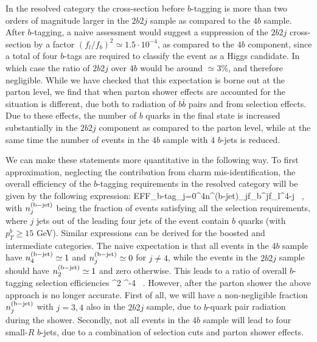 In the resolved category 
the cross-section  before
$b$-tagging is more than two orders
of magnitude larger in the $2b2j$
sample as compared to the $4b$ sample.
%
After $b$-tagging, a naive assessment would
suggest a suppression of the $2b2j$ cross-section by a factor $(f_l/f_b)^2 \simeq
1.5\cdot 10^{-4}$, as compared to the $4b$ component,
since a total of four $b$-tags are required to classify the
event as a Higgs candidate.
%
In which case the ratio of $2b2j$ over $4b$ would be
around $\simeq 3\%$, and therefore negligible.
While  we have checked that this expectation is borne
out at the parton level,
we find that  when parton shower effects
are accounted for the situation is different, due both to radiation of $b\bar{b}$ pairs
and from selection effects.
%
Due to these effects,
the
number of  $b$ quarks in the  final state is
increased substantially in the $2b2j$ component as compared
to the parton level, while at the same
time the number of events in the $4b$ sample
with 4 $b$-jets is reduced.


We can make these statements more quantitative in the following way.
%
To first approximation, neglecting the contribution from
charm mis-identification,
the
overall efficiency of the $b$-tagging requirements in the resolved category will be
given by the following expression:
\be
\label{btaggingeff}
{\rm EFF}_{\rm b-tag}\simeq \sum_{j=0}^{4}n^{\rm (b-jet)}_j\cdot f_b^{j}\cdot f_l^{4-j} \, ,
\ee
with $n^{\rm (b-jet)}_j$ being the fraction of events satisfying all the selection
requirements,
where $j$ jets out of the leading four jets of the event
contain $b$ quarks (with $p_T^b\ge 15$
GeV).
%
Similar expressions can be derived for
the boosted and intermediate categories.
%
The naive expectation is that all events in the $4b$ sample have $n^{\rm (b-jet)}_4\simeq 1$
and $n^{\rm (b-jet)}_j\simeq 0$ for $j\ne 4$, while the events in the $2b2j$ sample
should have $n^{\rm (b-jet)}_2\simeq 1$ and zero otherwise.
%
This leads to a ratio of overall $b$-tagging selection efficiencies
\be
\label{eq:naive}
  \simeq
 \lp {}\rp^2 ^{-4} \, .
\ee
However, after the parton shower the above approach is no longer accurate.
%
First of all, we will have a non-negligible fraction $n^{\rm (b-jet)}_j$
with $j=3,4$ also in the $2b2j$ sample, due to $b$-quark pair radiation
during the shower.
%
Secondly, not all events in the $4b$ sample will lead to four small-$R$ $b$-jets,
due to a combination of selection cuts and
parton shower effects.
%

